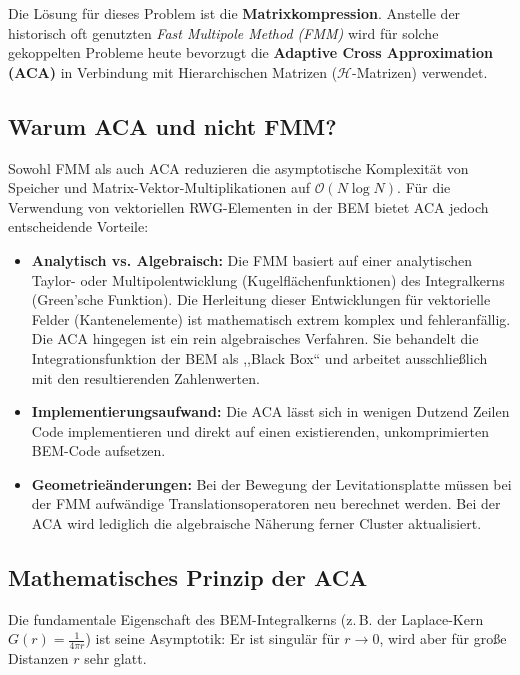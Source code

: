 \documentclass[11pt,a4paper]{article}
\begin{document}
Die Lösung für dieses Problem ist die \textbf{Matrixkompression}. Anstelle der historisch oft genutzten \textit{Fast Multipole Method (FMM)} wird für solche gekoppelten Probleme heute bevorzugt die \textbf{Adaptive Cross Approximation (ACA)} in Verbindung mit Hierarchischen Matrizen ($\mathcal{H}$-Matrizen) verwendet.

\subsection{Warum ACA und nicht FMM?}
Sowohl FMM als auch ACA reduzieren die asymptotische Komplexität von Speicher und Matrix-Vektor-Multiplikationen auf $\mathcal{O}(N \log N)$. Für die Verwendung von vektoriellen RWG-Elementen in der BEM bietet ACA jedoch entscheidende Vorteile:
\begin{itemize}
    \item \textbf{Analytisch vs. Algebraisch:} Die FMM basiert auf einer analytischen Taylor- oder Multipolentwicklung (Kugelflächenfunktionen) des Integralkerns (Green'sche Funktion). Die Herleitung dieser Entwicklungen für vektorielle Felder (Kantenelemente) ist mathematisch extrem komplex und fehleranfällig. Die ACA hingegen ist ein rein algebraisches Verfahren. Sie behandelt die Integrationsfunktion der BEM als ,,Black Box`` und arbeitet ausschließlich mit den resultierenden Zahlenwerten.
    \item \textbf{Implementierungsaufwand:} Die ACA lässt sich in wenigen Dutzend Zeilen Code implementieren und direkt auf einen existierenden, unkomprimierten BEM-Code aufsetzen.
    \item \textbf{Geometrieänderungen:} Bei der Bewegung der Levitationsplatte müssen bei der FMM aufwändige Translationsoperatoren neu berechnet werden. Bei der ACA wird lediglich die algebraische Näherung ferner Cluster aktualisiert.
\end{itemize}

\subsection{Mathematisches Prinzip der ACA}
Die fundamentale Eigenschaft des BEM-Integralkerns (z.\,B. der Laplace-Kern $G(r) = \frac{1}{4\pi r}$) ist seine Asymptotik: Er ist singulär für $r \to 0$, wird aber für große Distanzen $r$ sehr glatt. 
\end{document}
